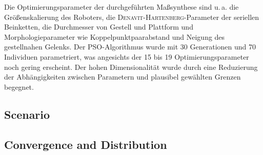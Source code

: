 \documentclass[fleqn,a4paper,10pt]{article}
\begin{document}
\begin{multicols}{2}
Die Optimierungsparameter der durchgeführten Maßsynthese sind u.\,a. die Größenskalierung des Roboters, die \textsc{Denavit-Hartenberg}-Parameter der seriellen Beinketten, die Durchmesser von Gestell und Plattform und Morphologieparameter wie Koppelpunktpaarabstand und Neigung des gestellnahen Gelenks.
Der PSO-Algorithmus wurde mit 30 Generationen und 70 Individuen parametriert, was angesichts der 15 bis 19 Optimierungsparameter noch gering erscheint.
Der hohen Dimensionalität wurde durch eine Reduzierung der Abhängigkeiten zwischen Parametern und plausibel gewählten Grenzen begegnet.







\subsection{Scenario}

\subsection{Convergence and Distribution}



\end{multicols}
\end{document}
